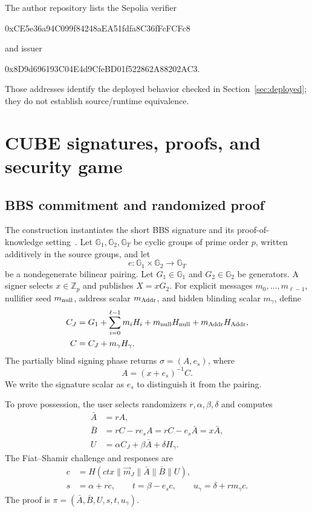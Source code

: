 \documentclass[10pt,a4paper]{article}
\newcommand{\GOne}{\mathbb{G}_1}
\newcommand{\GTwo}{\mathbb{G}_2}
\newcommand{\GT}{\mathbb{G}_T}
\newcommand{\Zp}{\mathbb{Z}_p}
\begin{document}
The author repository lists the Sepolia verifier
\begin{center}
\small\ttfamily
0xCE5e36a94C099f84248aEA51fdfa8C36fFcFCFc8
\end{center}
and issuer
\begin{center}
\small\ttfamily
0x8D9d696193C04E4d9CfeBD01f522862A88202AC3.
\end{center}
Those addresses identify the deployed behavior checked in
Section~\ref{sec:deployed}; they do not establish source/runtime equivalence.

\section{CUBE signatures, proofs, and security game}

\subsection{BBS commitment and randomized proof}

The construction instantiates the short BBS signature and its proof-of-
knowledge setting~\cite{bbs,tessaro-zhu}.
Let $\GOne,\GTwo,\GT$ be cyclic groups of prime order $p$, written additively
in the source groups, and let
\[
 e:\GOne\times\GTwo\longrightarrow\GT
\]
be a nondegenerate bilinear pairing. Let $G_1\in\GOne$ and
$G_2\in\GTwo$ be generators. A signer selects $x\in\Zp$ and publishes
$X=xG_2$. For explicit messages $m_0,\ldots,m_{\ell-1}$, nullifier seed
$m_{\rm null}$, address scalar $m_{\rm Addr}$, and hidden blinding scalar
$m_\gamma$, define
\begin{align}
 C_J &= G_1+\sum_{i=0}^{\ell-1}m_iH_i
            +m_{\rm null}H_{\rm null}
            +m_{\rm Addr}H_{\rm Addr},                 \label{eq:cj}\\
 C   &= C_J+m_\gamma H_\gamma.                         \label{eq:c}
\end{align}
The partially blind signing phase returns $\sigma=(A,e_s)$, where
\begin{equation}
 A=(x+e_s)^{-1}C.                                      \label{eq:bbs}
\end{equation}
We write the signature scalar as $e_s$ to distinguish it from the pairing.

To prove possession, the user selects randomizers $r,\alpha,\beta,\delta$
and computes
\begin{align}
 \bar A &= rA,                                         \label{eq:abar}\\
 \bar B &= rC-re_sA=rC-e_s\bar A=x\bar A,             \label{eq:bbar}\\
 U      &= \alpha C_J+\beta\bar A+\delta H_\gamma.    \label{eq:u}
\end{align}
The Fiat--Shamir challenge and responses are
\begin{align}
 c &= H(\mathit{ctx}\parallel\vec m_J\parallel
          \bar A\parallel\bar B\parallel U),          \label{eq:challenge}\\
 s &= \alpha+rc,\qquad
 t=\beta-e_sc,\qquad
 u_\gamma=\delta+rm_\gamma c.                         \label{eq:responses}
\end{align}
The proof is
$\pi=(\bar A,\bar B,U,s,t,u_\gamma)$.
\end{document}
